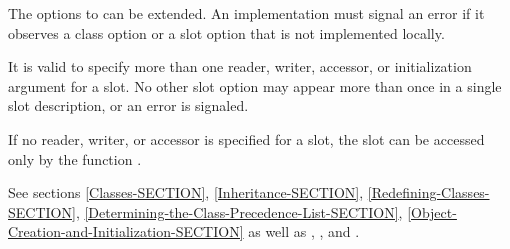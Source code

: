 \begin{defmac}
The options to  can be extended.
An implementation must signal an error if it observes a class option or
a slot option that is not implemented locally.

It is valid to specify more than one reader, writer, accessor, or
initialization argument for a slot.  No other slot option may appear
more than once in a single slot description, or an error is
signaled.

If no reader, writer, or accessor is specified for a slot, the slot
can be accessed only by the function .

See sections \ref{Classes-SECTION},
\ref{Inheritance-SECTION},
\ref{Redefining-Classes-SECTION},
\ref{Determining-the-Class-Precedence-List-SECTION},
\ref{Object-Creation-and-Initialization-SECTION} as well as
,
, and
.
\end{defmac}

